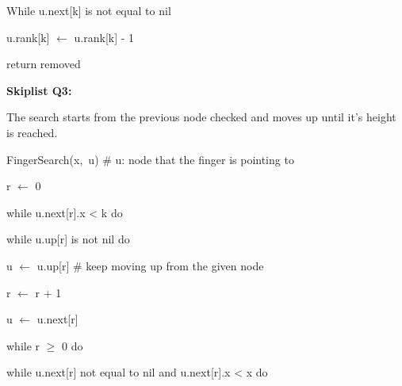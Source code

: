 \documentclass[12pt]{article}
\renewcommand{\_}{\kern-1.5pt\textunderscore\kern-1.5pt}
\begin{document}
\begin{adjustwidth}{0.5in}{0.0in}
While u.next[k] is not equal to nil\par

\end{adjustwidth}

\begin{adjustwidth}{0.5in}{0.0in}
\tab u.rank[k] $ \leftarrow $  u.rank[k] - 1\par

\end{adjustwidth}

\begin{adjustwidth}{0.5in}{0.0in}
return removed \par

\end{adjustwidth}


\vspace{\baselineskip}
\textbf{Skiplist Q3:}\par


\vspace{\baselineskip}
The search starts from the previous node checked and moves up until it’s height is reached.\par


\vspace{\baselineskip}
FingerSearch(x,\ u)  $\#$  u: node that the finger is pointing to\par

r $ \leftarrow $  0\par

while u.next[r].x < k do \par

\begin{adjustwidth}{0.5in}{0.0in}
 while u.up[r] is not nil do\par

\end{adjustwidth}

\tab \tab u $ \leftarrow $  u.up[r] $\#$ keep moving up from the given node\par

\tab \tab r $ \leftarrow $  r + 1\par

\tab u $ \leftarrow $  u.next[r]\par

while r $ \geq $  0 do \par

\begin{adjustwidth}{0.5in}{0.0in}
while u.next[r] not equal to nil and u.next[r].x < x do \par

\end{adjustwidth}
\end{document}

